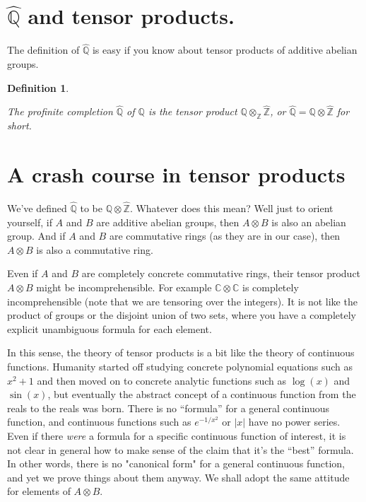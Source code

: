 \documentclass[10pt,a4paper]{article}
\newcommand{\Z}{\mathbb{Z}}
\newcommand{\Q}{\mathbb{Q}}
\newcommand{\bbC}{\mathbb{C}}
\newcommand{\Qhat}{\widehat{\Q}}
\newcommand{\Zhat}{\widehat{\Z}}
\newtheorem{definition}[theorem]{Definition}
\newcommand{\uses}[1]{}
\newcommand{\lean}[1]{}
\newcommand{\leanok}{}
\begin{document}
\section{\texorpdfstring{$\Qhat$}{Qhat} and tensor products.}

The definition of $\Qhat$ is easy if you know about tensor products
of additive abelian groups.

\begin{definition}
    \label{QHat}
    \lean{QHat}
    \uses{ZHat}
    \leanok
    The profinite completion $\Qhat$ of $\Q$ is the tensor product $\Q\otimes_{\Z}\Zhat$,
    or $\Qhat=\Q\otimes\Zhat$ for short.
\end{definition}

\section{A crash course in tensor products}

We've defined $\Qhat$ to be $\Q\otimes\Zhat$. Whatever does this mean? Well just to orient yourself,
if $A$ and $B$ are additive abelian groups, then $A\otimes B$ is also an abelian group.
And if $A$ and $B$ are commutative rings (as they are in our case), then $A\otimes B$ is also
a commutative ring.

Even if $A$ and $B$ are completely concrete commutative rings, their tensor product $A\otimes B$
might be incomprehensible. For example $\bbC\otimes\bbC$ is completely incomprehensible (note that we are
tensoring over the integers). It is not like the product of groups or the disjoint union of
two sets, where you have a completely explicit unambiguous formula for each element.

In this sense, the theory of tensor products is a bit like the theory of continuous functions.
Humanity started off studying concrete polynomial equations such as $x^2+1$ and then moved on to
concrete analytic functions such as $\log(x)$ and $\sin(x)$, but eventually the abstract concept
of a continuous function from the reals to the reals was born. There is no ``formula'' for a general
continuous function, and continuous functions such as $e^{-1/x^2}$ or $|x|$ have no power series.
Even if there \emph{were} a formula for a specific continuous function of interest, it is not clear
in general how to make sense of the claim that it's the ``best'' formula. In other words, there is
no "canonical form" for a general continuous function, and yet we prove things about them anyway.
We shall adopt the same attitude for elements of $A\otimes B$.
\end{document}
